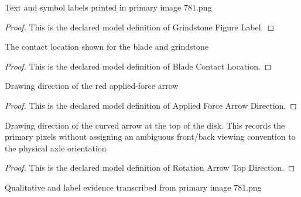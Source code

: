\begin{definition}
  \label{def:physics:phyx-mini-0781:phyxminiproblems-problemphyxmini0781-grindstonefigurelabel}
  Text and symbol labels printed in primary image 781.png
\end{definition}
\begin{proof}
  This is the declared model definition of Grindstone Figure Label.
\end{proof}
\begin{definition}
  \label{def:physics:phyx-mini-0781:phyxminiproblems-problemphyxmini0781-bladecontactlocation}
  The contact location shown for the blade and grindstone
\end{definition}
\begin{proof}
  This is the declared model definition of Blade Contact Location.
\end{proof}
\begin{definition}
  \label{def:physics:phyx-mini-0781:phyxminiproblems-problemphyxmini0781-appliedforcearrowdirection}
  Drawing direction of the red applied-force arrow
\end{definition}
\begin{proof}
  This is the declared model definition of Applied Force Arrow Direction.
\end{proof}
\begin{definition}
  \label{def:physics:phyx-mini-0781:phyxminiproblems-problemphyxmini0781-rotationarrowtopdirection}
  Drawing direction of the curved arrow at the top of the disk. This records the primary pixels without assigning an ambiguous front/back viewing convention to the physical axle orientation
\end{definition}
\begin{proof}
  This is the declared model definition of Rotation Arrow Top Direction.
\end{proof}
\begin{definition}
  \label{def:physics:phyx-mini-0781:phyxminiproblems-problemphyxmini0781-grindstonefigure}
  Qualitative and label evidence transcribed from primary image 781.png
\end{definition}
